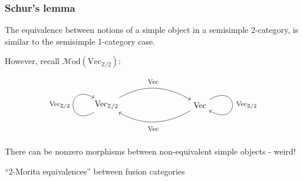 \documentclass{beamer}
\newcommand{\ZZ}{{\mathbb{Z}}}
\newcommand{\Vect}{{\textrm{Vec}}}
\newcommand{\Mod}{{\mathcal{M}\textrm{od}}}
\newcommand{\ModA}[1]{{\Mod(#1)}}
\begin{document}
\begin{frame}
\frametitle{Schur's lemma}

The equivalence between notions of a simple object
in a semisimple 2-category,
is similar to the semisimple 1-category case.

\pause

However, recall $\ModA{\Vect_{\ZZ/2}}$:

\[
\begin{tikzpicture}
\node (a) at (0,0) {$\Vect_{\ZZ/2}$};
\node (b) at (4,0) {$\Vect$};
\draw[->] (a) to[out=30,in=150] (b);
\node at (2,1) {\footnotesize $\Vect$};
\draw[->] (b) to[out=-150,in=-30] (a);
\node at (2,-1) {\footnotesize $\Vect$};
\draw[->] (a) .. controls +(-150:2cm) and +(150:2cm) .. (a);
\node at (-2,0) {\footnotesize $\Vect_{\ZZ/2}$};
\draw[->] (b) .. controls +(30:2cm) and +(-30:2cm) .. (b);
\node at (6,0) {\footnotesize $\Vect_{\ZZ/2}$};
\end{tikzpicture}
\]

\pause

There can be nonzero morphisms between
non-equivalent simple objects - weird!

\pause

``2-Morita equivalences'' between fusion categories


\end{frame}
\end{document}
